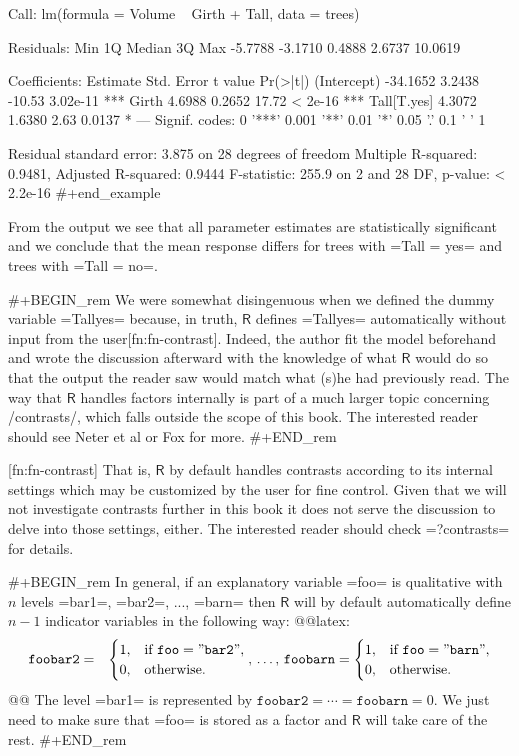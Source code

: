 Call:
lm(formula = Volume ~ Girth + Tall, data = trees)

Residuals:
    Min      1Q  Median      3Q     Max 
-5.7788 -3.1710  0.4888  2.6737 10.0619 

Coefficients:
            Estimate Std. Error t value Pr(>|t|)    
(Intercept) -34.1652     3.2438  -10.53 3.02e-11 ***
Girth         4.6988     0.2652   17.72  < 2e-16 ***
Tall[T.yes]   4.3072     1.6380    2.63   0.0137 *  
---
Signif. codes:  0 '***' 0.001 '**' 0.01 '*' 0.05 '.' 0.1 ' ' 1

Residual standard error: 3.875 on 28 degrees of freedom
Multiple R-squared:  0.9481,	Adjusted R-squared:  0.9444 
F-statistic: 255.9 on 2 and 28 DF,  p-value: < 2.2e-16
#+end_example

From the output we see that all parameter estimates are statistically
significant and we conclude that the mean response differs for trees
with =Tall = yes= and trees with =Tall = no=.

#+BEGIN_rem
We were somewhat disingenuous when we defined the dummy variable
=Tallyes= because, in truth, \(\mathsf{R}\) defines =Tallyes=
automatically without input from the user[fn:fn-contrast]. Indeed, the
author fit the model beforehand and wrote the discussion afterward
with the knowledge of what \(\mathsf{R}\) would do so that the output
the reader saw would match what (s)he had previously read. The way
that \(\mathsf{R}\) handles factors internally is part of a much
larger topic concerning /contrasts/, which falls outside the scope of
this book. The interested reader should see Neter et al
\cite{Neter1996} or Fox \cite{Fox1997} for more.
#+END_rem

[fn:fn-contrast] That is, \(\mathsf{R}\) by default handles contrasts
according to its internal settings which may be customized by the user
for fine control. Given that we will not investigate contrasts further
in this book it does not serve the discussion to delve into those
settings, either. The interested reader should check =?contrasts= for
details.

#+BEGIN_rem
In general, if an explanatory variable =foo= is qualitative with \(n\)
levels =bar1=, =bar2=, ..., =barn= then \(\mathsf{R}\) will by default
automatically define \(n-1\) indicator variables in the following way:
@@latex:\begin{eqnarray*} \mathtt{foobar2} & = & \begin{cases} 1, & \mbox{if }\mathtt{foo}=\mathtt{"bar2"},\\ 0, & \mbox{otherwise.}\end{cases},\,\ldots,\,\mathtt{foobarn}=\begin{cases} 1, & \mbox{if }\mathtt{foo}=\mathtt{"barn"},\\ 0, & \mbox{otherwise.}\end{cases} \end{eqnarray*}@@
The level =bar1= is represented by
\(\mathtt{foobar2}=\cdots=\mathtt{foobarn}=0\). We just need to make
sure that =foo= is stored as a factor and \(\mathsf{R}\) will take
care of the rest.
#+END_rem

